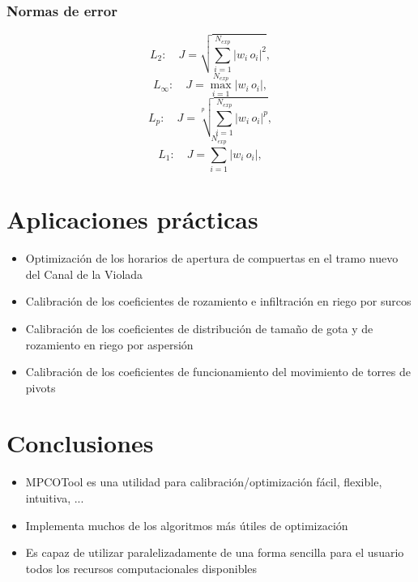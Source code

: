 \documentclass{beamer}
\newcommand{\ABS}[1]{\left|#1\right|}
\begin{document}
\begin{frame}
	\frametitle{Normas de error}
	\[L_2:\quad J=\sqrt{\sum_{i=1}^{N_{exp}}\ABS{w_i\,o_i}^2},\]
	\[L_\infty:\quad J=\max_{i=1}^{N_{exp}}\ABS{w_i\,o_i},\]
	\[L_p:\quad J=\sqrt[p]{\sum_{i=1}^{N_{exp}}\ABS{w_i\,o_i}^p},\]
	\[L_1:\quad J=\sum_{i=1}^{N_{exp}}\ABS{w_i\,o_i},\]
\end{frame}

\section{Aplicaciones prácticas}

\begin{frame}
	\begin{itemize}
		\item Optimización de los horarios de apertura de compuertas en el tramo
			nuevo del Canal de la Violada
		\item Calibración de los coeficientes de rozamiento e infiltración en
			riego por surcos
		\item Calibración de los coeficientes de distribución de tamaño de gota
			y de rozamiento en riego por aspersión
		\item Calibración de los coeficientes de funcionamiento del movimiento
			de torres de pivots
	\end{itemize}
\end{frame}

\section{Conclusiones}

\begin{frame}
\begin{itemize}
	\item MPCOTool es una utilidad para calibración/optimización fácil,
		flexible, intuitiva, ...
	\item Implementa muchos de los algoritmos más útiles de optimización
	\item Es capaz de utilizar paralelizadamente de una forma sencilla para el
		usuario todos los recursos computacionales disponibles
\end{itemize}
\end{frame}
\end{document}
